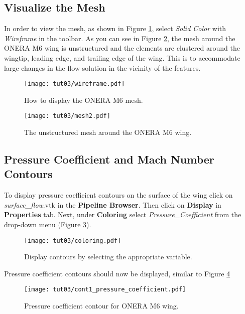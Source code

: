 \subsection{Visualize the Mesh}
In order to view the mesh, as shown in Figure \ref{fig3:wireframe}, select \textit{Solid Color} with \textit{Wireframe} in the toolbar. As you can see in Figure \ref{fig3:mesh}, the mesh around the ONERA M6 wing is unstructured and the elements are clustered around the wingtip, leading edge, and trailing edge of the wing. This is to accommodate large changes in the flow solution in the vicinity of the features.
\begin{figure}[htbp]
    \centering
    \texttt{[image: tut03/wireframe.pdf]}
    \caption{How to display the ONERA M6 mesh.}
    \label{fig3:wireframe}
\end{figure}
\begin{figure}[htbp]
    \centering
    \texttt{[image: tut03/mesh2.pdf]}
    \caption{The unstructured mesh around the ONERA M6 wing.}
    \label{fig3:mesh}
\end{figure}
\subsection{Pressure Coefficient and Mach Number Contours}
To display pressure coefficient contours on the surface of the wing click on \textit{surface\_flow}.vtk in the \textbf{Pipeline Browser}. Then click on \textbf{Display} in \textbf{Properties} tab. Next, under \textbf{Coloring} select \textit{Pressure\_Coefficient} from the drop-down menu (Figure \ref{fig3:pressure_coeff_1}).
\begin{figure}[htbp]
    \centering
    \texttt{[image: tut03/coloring.pdf]}
    \caption{Display contours by selecting the appropriate variable.}
    \label{fig3:pressure_coeff_1}
\end{figure}
Pressure coefficient contours should now be displayed, similar to Figure \ref{fig3:plot_pressure_coeff}
\begin{figure}[htbp]
    \centering
    \texttt{[image: tut03/cont1\_pressure\_coefficient.pdf]}
    \caption{Pressure coefficient contour for ONERA M6 wing.}
    \label{fig3:plot_pressure_coeff}
\end{figure}


